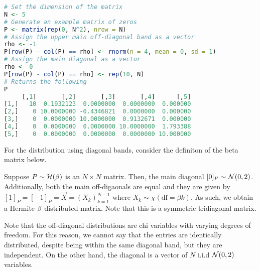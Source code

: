 \begin{lstlisting}[language=R]
# Set the dimension of the matrix
N <- 5
# Generate an example matrix of zeros
P <- matrix(rep(0, N^2), nrow = N)
# Assign the upper main off-diagonal band as a vector
rho <- -1
P[row(P) - col(P) == rho] <- rnorm(n = 4, mean = 0, sd = 1)
# Assign the main diagonal as a vector
rho <- 0
P[row(P) - col(P) == rho] <- rep(10, N)
# Returns the following
P
     [,1]       [,2]       [,3]       [,4]      [,5]
[1,]   10  0.1932123  0.0000000  0.0000000  0.000000
[2,]    0 10.0000000 -0.4346821  0.0000000  0.000000
[3,]    0  0.0000000 10.0000000  0.9132671  0.000000
[4,]    0  0.0000000  0.0000000 10.0000000  1.793388
[5,]    0  0.0000000  0.0000000  0.0000000 10.000000
\end{lstlisting}


%
%

For the distribution using diagonal bands, consider the definiton of the beta matrix below. %

\ALGbeta


\begin{definition}
Suppose $P \sim \mathcal{H}(\beta)$ is an $N \times N$ matrix. Then, the main diagonal $[0]_P \sim \mathcal{N}(0,2)$.
Additionally, both the main off-digaonals are equal and they are given by $[1]_{P} = [-1]_{P} = \vec{X} = (X_k)_{k=1}^{N-1}$ where $X_k \sim \chi(\text{df} = \beta k)$.
As such, we obtain a Hermite-$\beta$ distributed matrix. Note that this is a symmetric tridiagonal matrix.
\end{definition}

\begin{remark}
Note that the off-diagonal distributions are chi variables with varying degrees of freedom.
For this reason, we cannot say that the entries are identically distributed, despite being within the same diagonal band, but they are independent.
On the other hand, the diagonal is a vector of $N$ i.i.d $\mathcal{N}(0,2)$ variables.
\end{remark}

